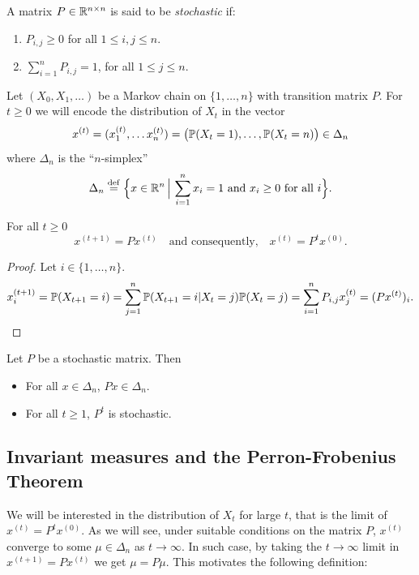 \documentclass[11pt,nocut]{article}
\begin{document}
\begin{definition}
	A matrix $P \in \R^{n \times n}$ is said to be \emph{stochastic} if:
	\begin{enumerate}[label=(\roman*),noitemsep]
		\item $P_{i,j} \geq 0$ for all $1 \leq i,j \leq n$.
		\item $\sum\limits_{i=1}^n P_{i,j} = 1$, for all $1 \leq j \leq n$.
	\end{enumerate}
\end{definition}

Let $(X_0, X_1, \dots)$ be a Markov chain on $\{1, \dots, n\}$ with transition matrix $P$. For $t \geq 0$ we will encode the distribution of $X_t$ in the vector
$$
x^{(t)} = (x^{(t)}_1, \dots x^{(t)}_n) 
= \big(\P(X_t = 1), \dots, \P(X_t = n)\big) \in \Delta_n
$$
where $\Delta_n$ is the ``$n$-simplex''
$$
\Delta_n \defeq \Big\{ x \in \R^n \, \Big| \, \sum_{i=1}^n x_i = 1 \ \text{and} \ x_i \geq 0 \ \text{for all} \ i \Big\}.
$$


\begin{proposition}
	For all $t \geq 0$
	$$
	x^{(t+1)} = P x^{(t)}
	\quad \text{and consequently,} \quad
	x^{(t)} =  P^t x^{(0)}.
	$$
\end{proposition}
\begin{proof} Let $i \in \{1,\dots, n\}$.
	\begin{align*}
		x^{(t+1)}_i
		= \P(X_{t+1}=i)
		= \sum_{j=1}^n \P(X_{t+1}=i|X_t = j) \P(X_t = j)
		= \sum_{i=1}^n P_{i,j} x^{(t)}_j
		= (Px^{(t)})_i.
	\end{align*}
\end{proof}

\begin{corollary}\label{cor:stab}
	Let $P$ be a stochastic matrix. Then
	\begin{itemize}
		\item For all $x \in \Delta_n$, $Px \in \Delta_n$.
		\item For all $t \geq 1$, $P^t$ is stochastic.
	\end{itemize}
\end{corollary}


\subsection{Invariant measures and the Perron-Frobenius Theorem}

We will be interested in the distribution of $X_t$ for large $t$, that is the limit of $x^{(t)} = P^t x^{(0)}$. As we will see, under suitable conditions on the matrix $P$, $x^{(t)}$ converge to some $\mu \in \Delta_n$ as $t \to \infty$. In such case, by taking the $t \to \infty$ limit in $x^{(t+1)} = P x^{(t)}$ we get $\mu = P \mu$. This motivates the following definition:
\end{document}
